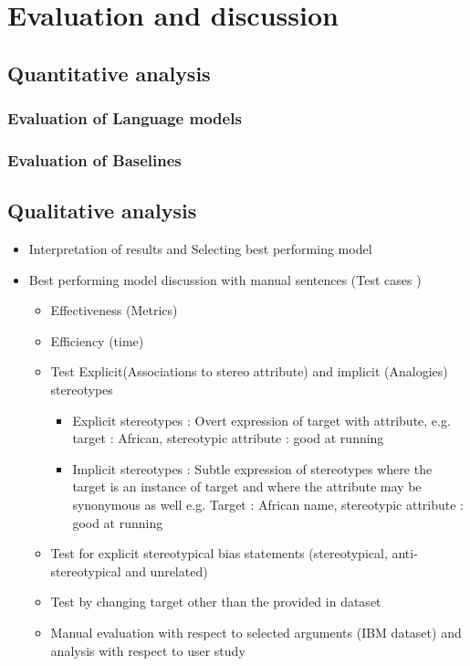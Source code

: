 \chapter{Evaluation and discussion}

\section{Quantitative analysis}

\subsection{Evaluation of Language models}
\subsection{Evaluation of Baselines}


\section{Qualitative analysis}
\begin{itemize}
    \item Interpretation of results and Selecting best performing model 
    \item Best performing model discussion with manual sentences (Test cases ) 
    \begin{itemize}
        \item Effectiveness (Metrics)
        \item Efficiency (time)
        \item Test Explicit(Associations to stereo attribute) and implicit (Analogies) stereotypes
        \begin{itemize}
            \item Explicit stereotypes : Overt expression of target with attribute, e.g. target : African, stereotypic attribute : good at running
            \item Implicit stereotypes : Subtle expression of stereotypes where the target is an instance of target and where the attribute may be synonymous as well
            e.g. Target : African name, stereotypic attribute :  good at running 
        \end{itemize} 
        \item Test for explicit stereotypical bias statements  (stereotypical, anti-stereotypical and unrelated)
        \item Test by changing target other than the provided in dataset 
        \item Manual evaluation with respect to selected arguments (IBM dataset) and analysis with respect to user study 
    \end{itemize}
\end{itemize}